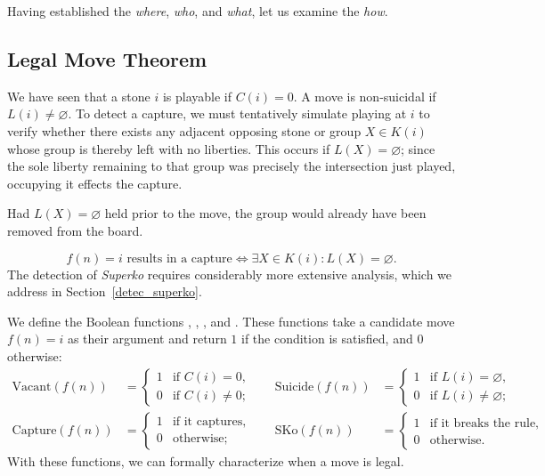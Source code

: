 Having established the \textit{where}, \textit{who}, and \textit{what}, let us examine the \textit{how}.

\subsection{Legal Move Theorem}

We have seen that a stone \(i\) is playable if \(C(i)=0\). A move is non-suicidal if \(L(i) \neq \varnothing\). To detect a capture, we must tentatively simulate playing at \(i\) to verify whether there exists any adjacent opposing stone or group \(X \in K(i)\) whose group is thereby left with no liberties. This occurs if \(L(X)=\varnothing\); since the sole liberty remaining to that group was precisely the intersection just played, occupying it effects the capture.

Had \(L(X)=\varnothing\) held prior to the move, the group would already have been removed from the board.

$$f(n) = i \text{ results in a capture} \iff \exists X \in K(i) : L(X)=\varnothing.$$
The detection of \textit{Superko} requires considerably more extensive analysis, which we address in Section~\ref{detec_superko}.

We define the Boolean functions , , , and . These functions take a candidate move $f(n) = i$ as their argument and return $1$ if the condition is satisfied, and $0$ otherwise:
\begin{align*}
	\text{Vacant}(f(n)) &= \begin{cases}
		1 & \text{if } C(i) = 0, \\
		0 & \text{if } C(i) \neq 0;
	\end{cases} & \quad
	\text{Suicide}(f(n)) &= \begin{cases}
		1 & \text{if } L(i) = \varnothing, \\
		0 & \text{if } L(i) \neq \varnothing;
	\end{cases} \\[1em]
	\text{Capture}(f(n)) &= \begin{cases}
		1 & \text{if it captures}, \\
		0 & \text{otherwise};
	\end{cases} & \quad
	\text{SKo}(f(n)) &= \begin{cases}
		1 & \text{if it breaks the rule}, \\
		0 & \text{otherwise}.
	\end{cases}
\end{align*}
With these functions, we can formally characterize when a move is legal.

